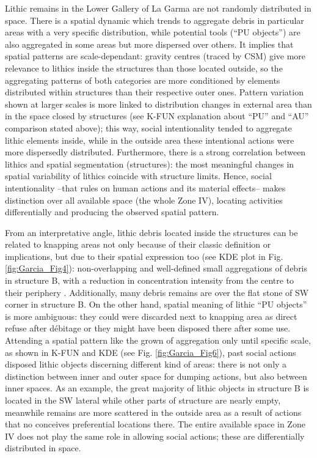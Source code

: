 Lithic remains in the Lower Gallery of La Garma are not randomly distributed in space. There is a spatial dynamic which trends to aggregate debris in particular areas with a very specific distribution, while potential tools (“PU objects”) are also aggregated in some areas but more dispersed over others. It implies that spatial patterns are scale-dependant: gravity centres (traced by CSM) give more relevance to lithics inside the structures than those located outside, so the aggregating patterns of both categories are more conditioned by elements distributed within structures than their respective outer ones. Pattern variation shown at larger scales is more linked to distribution changes in external area than in the space closed by structures (see K-FUN explanation about “PU” and “AU” comparison stated above); this way, social intentionality tended to aggregate lithic elements inside, while in the outside area these intentional actions were more dispersedly distributed. Furthermore, there is a strong correlation between lithics and spatial segmentation (structures): the most meaningful changes in spatial variability of lithics coincide with structure limits. Hence, social intentionality –that rules on human actions and its material effects– makes distinction over all available space (the whole Zone IV), locating activities differentially and producing the observed spatial pattern.

From an interpretative angle, lithic debris located inside the structures can be related to knapping areas not only because of their classic definition or implications, but due to their spatial expression too (see KDE plot in Fig. \ref{fig:Garcia_Fig4}): non-overlapping and well-defined small aggregations of debris in structure B, with a reduction in concentration intensity from the centre to their periphery \parencites[e.g.][]{Kvamme_1997}{Nadel_2001}{Newcomer_1980}. Additionally, many debris remains are over the flat stone of SW corner in structure B. On the  other hand, spatial meaning of lithic “PU objects” is more ambiguous: they could were discarded next to knapping area as direct refuse after débitage or they might have been disposed there after some use. Attending a spatial pattern like the grown of aggregation only until specific scale, as shown in K-FUN and KDE (see Fig. \ref{fig:Garcia_Fig6}), past social actions disposed lithic objects discerning different kind of areas: there is not only a distinction between inner and outer space for dumping actions, but also between inner spaces. As an example, the great majority of lithic objects in structure B is located in the SW lateral while other parts of structure are nearly empty, meanwhile remains are more scattered in the outside area as a result of actions that no conceives preferential locations there. The entire available space in Zone IV does not play the same role in allowing social actions; these are differentially distributed in space.

